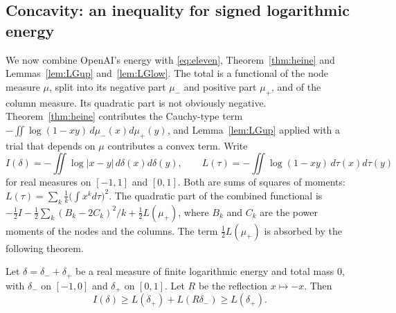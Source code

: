 \subsection{Concavity: an inequality for signed logarithmic energy}\label{ssec:reflection}
We now combine OpenAI's energy with \eqref{eq:eleven}, Theorem~\ref{thm:heine} and
Lemmas~\ref{lem:LGup} and~\ref{lem:LGlow}. The total is a functional of the node measure $\mu$, split into its
negative part $\mu_-$ and positive part $\mu_+$, and of the column measure. Its quadratic part is not obviously
negative. Theorem~\ref{thm:heine} contributes the Cauchy-type term $-\iint\log(1-xy)\,d\mu_-(x)d\mu_+(y)$,
and Lemma~\ref{lem:LGup} applied with a trial that depends on $\mu$ contributes a convex term. Write
\[
 I(\delta)=-\iint\log|x-y|\,d\delta(x)d\delta(y),\qquad L(\tau)=-\iint\log(1-xy)\,d\tau(x)d\tau(y)
\]
for real measures on $[-1,1]$ and $[0,1]$. Both are sums of squares of moments: $L(\tau)=\sum_k\frac1k\bigl(\int
x^kd\tau\bigr)^2$. The quadratic part of the combined functional is $-\frac12I-\frac12\sum_k(B_k-2C_k)^2/k+\frac12
L(\mu_+)$, where $B_k$ and $C_k$ are the power moments of the nodes and the columns. The term $\frac12L(\mu_+)$
is absorbed by the following theorem.

\begin{theorem}\label{thm:reflection}
Let $\delta=\delta_-+\delta_+$ be a real measure of finite logarithmic energy and total mass $0$, with
$\delta_-$ on $[-1,0]$ and $\delta_+$ on $[0,1]$. Let $R$ be the reflection $x\mapsto-x$. Then
\[
 I(\delta)\ge L(\delta_+)+L(R\delta_-)\ge L(\delta_+).
\]
\end{theorem}

